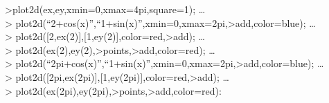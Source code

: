 \documentclass[
]{book}
\begin{document}
\textgreater plot2d(ex,ey,xmin=0,xmax=4pi,square=1); \ldots{}\\
\textgreater{} plot2d(``2+cos(x)'',``1+sin(x)'',xmin=0,xmax=2pi,\textgreater add,color=blue); \ldots{}\\
\textgreater{} plot2d({[}2,ex(2){]},{[}1,ey(2){]},color=red,\textgreater add); \ldots{}\\
\textgreater{} plot2d(ex(2),ey(2),\textgreater points,\textgreater add,color=red); \ldots{}\\
\textgreater{} plot2d(``2pi+cos(x)'',``1+sin(x)'',xmin=0,xmax=2pi,\textgreater add,color=blue); \ldots{}\\
\textgreater{} plot2d({[}2pi,ex(2pi){]},{[}1,ey(2pi){]},color=red,\textgreater add); \ldots{}\\
\textgreater{} plot2d(ex(2pi),ey(2pi),\textgreater points,\textgreater add,color=red):
\end{document}
